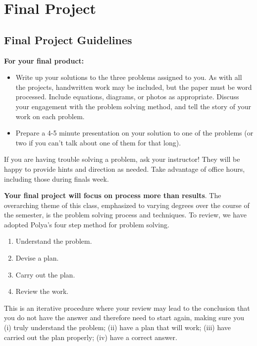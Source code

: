 \chapter{Final Project}\label{final}

\setcounter{section}{-1}
\section{Final Project Guidelines}\label{sec:FinalGuide}
\noindent \textbf{For your final product:}
\begin{itemize}
	\item Write up your solutions to the three problems assigned to you. As with all the projects, handwritten work may be included, but the paper must be word processed. Include equations, diagrams, or photos as appropriate. Discuss your engagement with the problem solving method, and tell the story of your work on each problem.
	\item Prepare a 4-5 minute presentation on your solution to one of the problems (or two if you can't talk about one of them for that long).
\end{itemize}
\bigskip{}

\noindent If you are having trouble solving a problem, ask your instructor! They will be happy to provide hints and direction as needed. Take advantage of office hours, including those during finals week.

\textbf{Your final project will focus on process more than results}. The overarching theme of this class, emphasized to varying degrees over the course of the semester, is the problem solving process and techniques. To review, we have adopted Polya's four step method for problem solving.
\begin{enumerate}
	\item Understand the problem.
	\item Devise a plan.
	\item Carry out the plan.
	\item Review the work.
\end{enumerate}
This is an iterative procedure where your review may lead to the conclusion that you do not have the answer and therefore need to start again, making sure you (i) truly understand the problem; (ii) have a plan that will work; (iii) have carried out the plan properly; (iv) have a correct answer.

